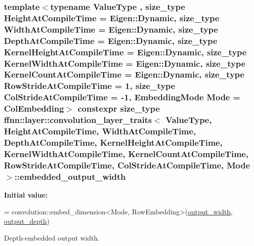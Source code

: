 \hypertarget{structffnn_1_1layer_1_1convolution__layer__traits_a34a2b3bbb6a24b89d48554b7c56d9654}{
\subsubsection[{embedded\-\_\-output\-\_\-width}]{\setlength{\rightskip}{0pt plus 5cm}template$<$typename Value\-Type , size\-\_\-type Height\-At\-Compile\-Time = Eigen\-::\-Dynamic, size\-\_\-type Width\-At\-Compile\-Time = Eigen\-::\-Dynamic, size\-\_\-type Depth\-At\-Compile\-Time = Eigen\-::\-Dynamic, size\-\_\-type Kernel\-Height\-At\-Compile\-Time = Eigen\-::\-Dynamic, size\-\_\-type Kernel\-Width\-At\-Compile\-Time = Eigen\-::\-Dynamic, size\-\_\-type Kernel\-Count\-At\-Compile\-Time = Eigen\-::\-Dynamic, size\-\_\-type Row\-Stride\-At\-Compile\-Time = 1, size\-\_\-type Col\-Stride\-At\-Compile\-Time = -\/1, Embedding\-Mode Mode = Col\-Embedding$>$ constexpr {\bf size\-\_\-type} {\bf ffnn\-::layer\-::convolution\-\_\-layer\-\_\-traits}$<$ Value\-Type, Height\-At\-Compile\-Time, Width\-At\-Compile\-Time, Depth\-At\-Compile\-Time, Kernel\-Height\-At\-Compile\-Time, Kernel\-Width\-At\-Compile\-Time, Kernel\-Count\-At\-Compile\-Time, Row\-Stride\-At\-Compile\-Time, Col\-Stride\-At\-Compile\-Time, Mode $>$\-::embedded\-\_\-output\-\_\-width\hspace{0.3cm}{\ttfamily [static]}}}\label{structffnn_1_1layer_1_1convolution__layer__traits_a34a2b3bbb6a24b89d48554b7c56d9654}
{\bfseries Initial value\-:}
\begin{DoxyCode}
=
    convolution::embed\_dimension<Mode, RowEmbedding>(\hyperlink{structffnn_1_1layer_1_1convolution__layer__traits_a8139122e587481fb9584f2b446e4ea11}{output\_width},  
      \hyperlink{structffnn_1_1layer_1_1convolution__layer__traits_ad2c2cfab03dd0a071bf0497ecf514086}{output\_depth})
\end{DoxyCode}


Depth-\/embedded output width. 

